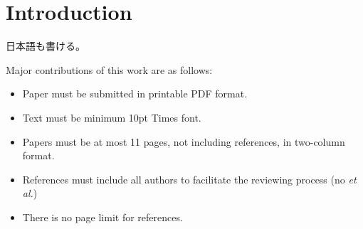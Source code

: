 \section{Introduction}

日本語も書ける。

\vspace{1ex}Major contributions of this work are as follows:

\begin{itemize}
\item Paper must be submitted in printable PDF format.
\item Text must be minimum 10pt Times font.
\item Papers must be at most 11 pages, not including references, in two-column format.
\item References must include all authors to facilitate the reviewing process (no \emph{et al.})
\item There is no page limit for references.
\end{itemize}


